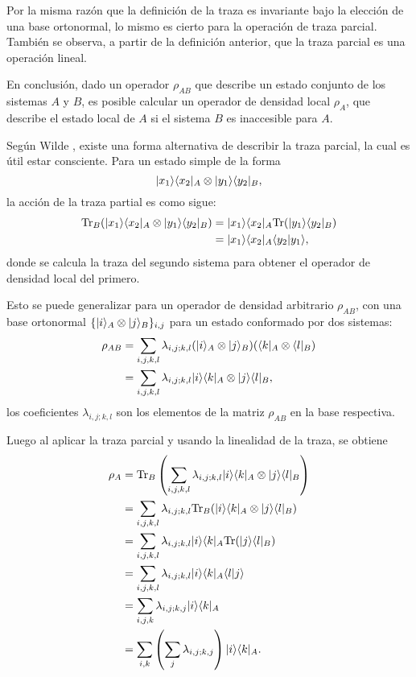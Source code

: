 Por la misma razón que la definición de la traza es invariante bajo la elección
de una base ortonormal, lo mismo es cierto para la operación de traza parcial.
También se observa, a partir de la definición anterior, que la traza parcial es
una operación lineal.

En conclusión, dado un operador $\rho_{AB}$ que describe un estado conjunto de
los sistemas $A$ y $B$, es posible calcular un operador de densidad local
$\rho_A$, que describe el estado local de $A$ si el sistema $B$ es inaccesible
para $A$.


Según Wilde {\cite{wilde2011classical}}, existe una forma alternativa de
describir la traza parcial, la cual es útil estar consciente. Para un estado
simple de la forma  
\begin{equation}
	|x_1\rangle \langle x_2|_A\otimes|y_1\rangle \langle y_2|_B,
\end{equation} 
la acción de la traza partial es como sigue: 
\begin{equation}
	\begin{split}
	{\rm Tr}_B(	|x_1\rangle \langle x_2|_A\otimes|y_1\rangle \langle y_2|_B)&=|x_1\rangle \langle x_2|_A{\rm Tr}(|y_1\rangle \langle y_2|_B)\\
	&=|x_1\rangle \langle x_2|_A \langle y_2|y_1\rangle,
	\end{split}
\end{equation}
donde se calcula la traza del segundo sistema para obtener el operador de
densidad local del primero.

Esto se puede generalizar para un operador de densidad arbitrario $\rho_{AB}$,
con una base ortonormal $\{|i \rangle_A \otimes |j\rangle_B \} _{i,j}$ para un estado
conformado por dos sistemas:
\begin{equation}
	\begin{split}
	\rho_{AB}&=\sum_{i,j,k,l}\lambda_{i,j;k,l}(|i\rangle_A \otimes|j\rangle_B)(\langle k|_A\otimes \langle l|_B)\\
	&=\sum_{i,j,k,l}\lambda_{i,j;k,l} |i\rangle \langle k|_A\otimes|j\rangle \langle l|_B,
	\end{split}
\end{equation}
los coeficientes $\lambda_{i,j;k,l}$  son los elementos de la matriz $\rho_{AB}$ en la base respectiva.


Luego al aplicar la traza parcial y usando la linealidad de la traza, se obtiene 
\begin{equation}
	\begin{split}
		\rho_A&={\rm Tr}_B\left(\sum_{i,j,k,l}\lambda_{i,j;k,l} |i\rangle \langle k|_A\otimes|j\rangle \langle l|_B\right)\\
		&=\sum_{i,j,k,l}\lambda_{i,j;k,l} {\rm Tr}_B(|i\rangle \langle k|_A\otimes|j\rangle \langle l|_B)\\
		&=\sum_{i,j,k,l}\lambda_{i,j;k,l}|i\rangle \langle k|_A {\rm Tr}(|j\rangle \langle l|_B)\\
		&=\sum_{i,j,k,l}\lambda_{i,j;k,l}|i\rangle \langle k|_A \langle l|j\rangle \\
		&=\sum_{i,j,k}\lambda_{i,j;k,j}|i\rangle \langle k|_A\\
		&=\sum_{i,k}\left(\sum_j\lambda_{i,j;k,j}\right)|i\rangle \langle k|_A.
	\end{split}
\end{equation}

